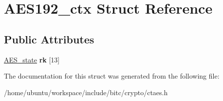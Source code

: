 \hypertarget{structAES192__ctx}{\section{A\-E\-S192\-\_\-ctx Struct Reference}
\label{structAES192__ctx}
}
\subsection*{Public Attributes}
\begin{DoxyCompactItemize}
\item 
\hypertarget{structAES192__ctx_a4cb89d8d8c4477bfdca2d115b2ebae97}{\hyperlink{structAES__state}{A\-E\-S\-\_\-state} {\bfseries rk} \mbox{[}13\mbox{]}}\label{structAES192__ctx_a4cb89d8d8c4477bfdca2d115b2ebae97}

\end{DoxyCompactItemize}


The documentation for this struct was generated from the following file\-:\begin{DoxyCompactItemize}
\item 
/home/ubuntu/workspace/include/bitc/crypto/ctaes.\-h\end{DoxyCompactItemize}
